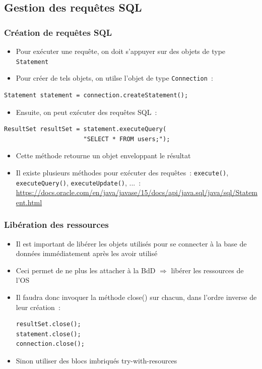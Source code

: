 \documentclass[aspectratio=169,10pt]{beamer}
\begin{document}
\subsection{Gestion des requêtes SQL}
\begin{frame}[fragile]
	\frametitle{Création de requêtes SQL}
	\begin{itemize}
		\item Pour exécuter une requête, on doit s'appuyer sur des objets de type \texttt{Statement}
		\item Pour créer de tels objets, on utilse l'objet de type \texttt{Connection}~:
	\end{itemize}
\begin{lstlisting}
Statement statement = connection.createStatement();
\end{lstlisting}
	\begin{itemize}		
		\item Ensuite, on peut exécuter des requêtes SQL~:
	\end{itemize}
\begin{lstlisting}
ResultSet resultSet = statement.executeQuery(
                      "SELECT * FROM users;");
\end{lstlisting}
\begin{itemize}		
	\item[] Cette méthode retourne un objet enveloppant le résultat
	\item Il existe plusieurs méthodes pour exécuter des requêtes~: \texttt{execute()}, \texttt{executeQuery()}, \texttt{executeUpdate()}, ...~:
	{\tiny \url{https://docs.oracle.com/en/java/javase/15/docs/api/java.sql/java/sql/Statement.html}}
\end{itemize}


\end{frame}

\begin{frame}[fragile]
	\frametitle{Libération des ressources}
	\begin{itemize}
		\item Il est important de libérer les objets utilisés pour se connecter à la base de données immédiatement après les avoir utilisé 
		\item Ceci permet de ne plus les attacher à la BdD $\Rightarrow$ libérer les ressources de l'OS
		\item Il faudra donc invoquer la méthode close() sur chacun, dans l'ordre inverse de leur création~:
\begin{lstlisting}
resultSet.close();
statement.close();
connection.close();
\end{lstlisting}
	\item Sinon utiliser des blocs imbriqués try-with-resources
	\end{itemize}
\end{frame}
\end{document}
